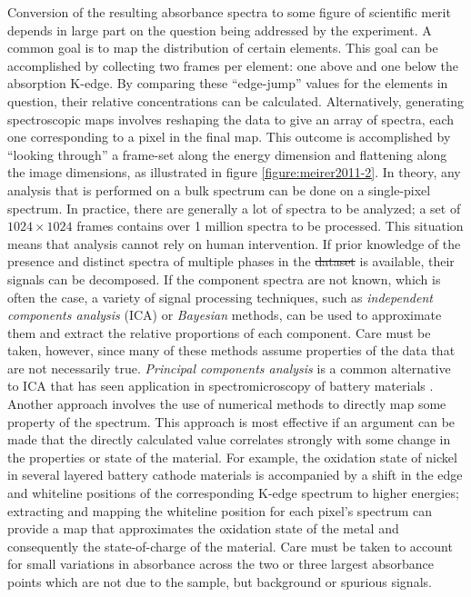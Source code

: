 \documentclass[journal=cmatex,manuscript=perspective]{achemso}
\providecommand{\DIFaddtex}[1]{{\protect\color{blue}\uwave{#1}}} %
\providecommand{\DIFdeltex}[1]{{\protect\color{red}\sout{#1}}}                      %
\providecommand{\DIFaddbegin}{} %
\providecommand{\DIFaddend}{} %
\providecommand{\DIFdelbegin}{} %
\providecommand{\DIFdelend}{} %
\providecommand{\DIFadd}[1]{\texorpdfstring{\DIFaddtex{#1}}{#1}} %
\providecommand{\DIFdel}[1]{\texorpdfstring{\DIFdeltex{#1}}{}} %
\begin{document}
\DIFaddend Conversion of the resulting absorbance spectra to some figure of
scientific merit depends in large part on the question being addressed
by the experiment. A common goal is to map the distribution of certain
elements. This goal can be accomplished by collecting two frames per
element: one above and one below the absorption K-edge. By comparing
these ``edge-jump'' values for the elements in question, their
relative concentrations can be
calculated\cite{shieh2006}. Alternatively, generating spectroscopic
maps involves reshaping the data to give an array of spectra, each one
corresponding to a pixel in the final map. This outcome is
accomplished by ``looking through'' a frame-set along the energy
dimension and flattening along the image dimensions, as illustrated in
figure \ref{figure:meirer2011-2}. In theory, any analysis that is
performed on a bulk spectrum can be done on a single-pixel
spectrum. In practice, there are generally a lot of spectra to be
analyzed; a set of $1024\times1024$ frames contains over 1 million
spectra to be processed. This situation means that analysis cannot
rely on human intervention. If prior knowledge of the presence and
distinct spectra of multiple phases in the \DIFdelbegin \DIFdel{dataset }\DIFdelend \DIFaddbegin \DIFadd{data-set }\DIFaddend is available,
their signals can be
decomposed\cite{wang2016,yu2015-2,shapiro2014}. If the component
spectra are not known, which is often the case, a variety of signal
processing techniques, such as \emph{independent components analysis}
(ICA)\cite{shlens2014} or \emph{Bayesian} methods\cite{knuth2005}, can
be used to approximate them and extract the relative proportions of
each component\cite{bioucas2012,duarte2014}. Care must be taken,
however, since many of these methods assume properties of the data
that are not necessarily true. \emph{Principal components analysis} is
a common alternative to ICA that has seen application in
spectromicroscopy of battery materials
\cite{shapiro2014,boesenberg2013}. Another approach involves the use
of numerical methods to directly map some property of the
spectrum. This approach is most effective if an argument can be made
that the directly calculated value correlates strongly with some
change in the properties or state of the material. For example, the
oxidation state of nickel in several layered battery cathode materials
is accompanied by a shift in the edge and whiteline positions of the
corresponding K-edge spectrum to higher energies\cite{deb2006};
extracting and mapping the whiteline position for each pixel's
spectrum can provide a map that approximates the oxidation state of
the metal and consequently the state-of-charge of the material. Care
must be taken to account for small variations in absorbance across the
two or three largest absorbance points which are not due to the
sample, but background or spurious signals.
\end{document}
